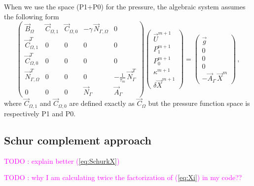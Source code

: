 \documentclass[a4paper,12pt,onecolumn]{article}
\newcommand{\NbulkT}{\vec{N}_{\Gamma,\Omega}^T}
\newcommand{\Nbulk}{\vec{N}_{\Gamma,\Omega}}
\begin{document}
When we use the space (P1+P0) for the pressure, the algebraic system assumes
the following form
\begin{equation}
\begin{pmatrix}
\vec B_\Omega & \vec C_{\Omega,1} & \vec C_{\Omega,0} & -\gamma\,\Nbulk & 0 \\
\vec C^T_{\Omega,1} & 0 & 0 & 0 & 0 \\
\vec C^T_{\Omega,0} & 0 & 0 & 0 & 0 \\
\NbulkT & 0 & 0 & 0 & -\frac1{\tau_m}\,\vec{N}_\Gamma^T \\
0 & 0 & 0 & \vec{N}_\Gamma & \vec{A}_\Gamma
\end{pmatrix}
\begin{pmatrix}
\vec U^{m+1} \\
P^{m+1}_1 \\
P^{m+1}_0 \\
\kappa^{m+1} \\
\delta\vec{X}^{m+1}
\end{pmatrix}
=
\begin{pmatrix}
\vec g \\
0 \\
0 \\
0 \\
-\vec{A}_\Gamma\,\vec{X}^{m}
\end{pmatrix} \,,
\label{eq:lin_p1p0}
\end{equation}
where $\vec C_{\Omega,1}$ and $\vec C_{\Omega,0}$ are defined exactly as $\vec
C_\Omega$ but the pressure function space is respectively P1 and P0.

\subsection{Schur complement approach}\label{sec:shur}

\textcolor{magenta}{TODO : explain better (\ref{eq:SchurkX})}

\textcolor{magenta}{TODO : why I am calculating twice the factorization of
(\ref{eq:Xi}) in my code??}
\end{document}
